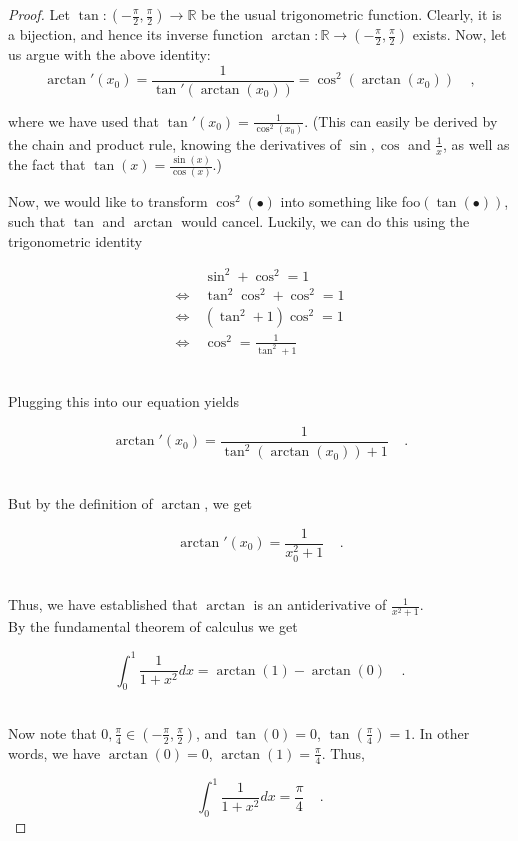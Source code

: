\documentclass[../../main.tex]{subfiles}
\begin{document}
\begin{proof}
    Let \( \tan : (- \frac{\pi}{2}, \frac{\pi}{2}) \rightarrow \mathbb R \) be the usual trigonometric function.
    Clearly, it is a bijection, and hence its inverse function \( \arctan : \mathbb R \rightarrow (- \frac{\pi}{2}, \frac{\pi}{2}) \) exists.
    Now, let us argue with the above identity:
    \[
        \arctan'(x_0) = \frac{1}{\tan'(\arctan(x_0))} = \cos^2(\arctan(x_0)) \ \ \ \ \ ,
    \]

    \noindent
    where we have used that \(\tan'(x_0) = \frac{1}{\cos^2(x_0)}\).
    (This can easily be derived by the chain and product rule, knowing the derivatives of \(\sin , \cos \) and \(\frac{1}{x}\), as well as the fact that \(\tan(x)=\frac{\sin(x)}{\cos(x)}\).)
    
    \noindent
    Now, we would like to transform \(\cos^2(\bullet)\) into something like foo\((\tan(\bullet))\), such that $\tan$ and $\arctan$ would cancel.
    Luckily, we can do this using the trigonometric identity

    \begin{align*}
    &\sin^2 + \cos^2 = 1 \\
    \Leftrightarrow \ &\tan^2 \cos^2 + \cos^2 = 1 \\
    \Leftrightarrow \ &(\tan^2 + 1) \cos^2 = 1 \\
    \Leftrightarrow \ &\cos^2 = \frac{1}{\tan^2 + 1}
    \end{align*}


    ~\\
    \noindent
    Plugging this into our equation yields

    \[
        \arctan'(x_0) = \frac{1}{\tan^2(\arctan(x_0)) + 1} \ \ \ \ \ .
    \]

    ~\\
    But by the definition of $\arctan$, we get

    \[
        \arctan'(x_0) = \frac{1}{x_0^2 + 1} \ \ \ \ \ .    
    \]

    ~\\
    Thus, we have established that $\arctan$ is an antiderivative of $\frac{1}{x^2 + 1}$.
    \\
    By the fundamental theorem of calculus we get

    \[
        \int_{0}^{1}\frac{1}{1+x^2} dx = \arctan(1) - \arctan(0) \ \ \ \ \ .
    \]

    ~\\
    Now note that \(0, \frac{\pi}{4} \in (- \frac{\pi}{2}, \frac{\pi}{2})\), and \(\tan(0) = 0\), \(\tan(\frac{\pi}{4}) = 1\).
    In other words, we have \(\arctan(0) = 0\),  \(\arctan(1) = \frac{\pi}{4}\). Thus,

    \[
        \int_{0}^{1}\frac{1}{1+x^2} dx = \frac{\pi}{4} \ \ \ \ \ .
    \]

\end{proof}
\end{document}
